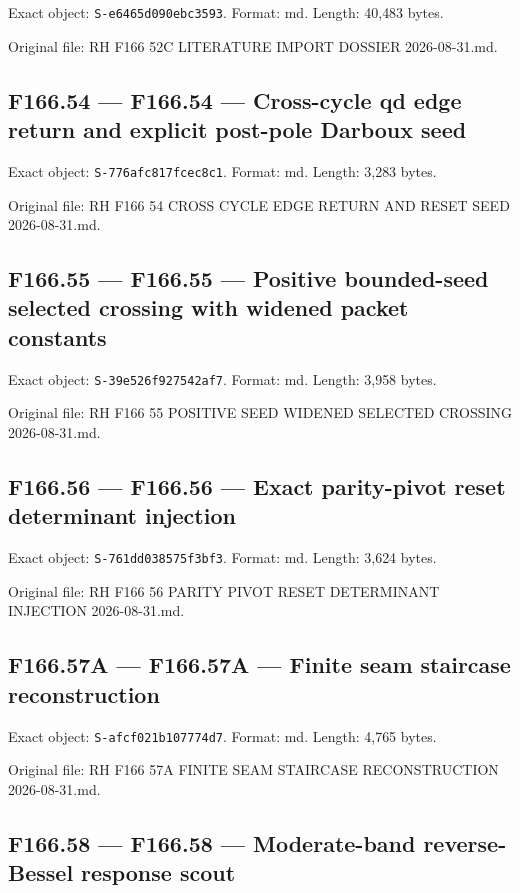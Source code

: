 \documentclass[
  10pt,
  a4paper,
  10pt,
  oneside,
  openany]{book}
\begin{document}
Exact object: \texttt{S-e6465d090ebc3593}. Format: md. Length: 40,483
bytes.

Original file: RH F166 52C LITERATURE IMPORT DOSSIER 2026-08-31.md.

\subsection{F166.54 --- F166.54 --- Cross-cycle qd edge return and
explicit post-pole Darboux seed}\label{source-f166-54}

Exact object: \texttt{S-776afc817fcec8c1}. Format: md. Length: 3,283
bytes.

Original file: RH F166 54 CROSS CYCLE EDGE RETURN AND RESET SEED
2026-08-31.md.

\subsection{F166.55 --- F166.55 --- Positive bounded-seed selected
crossing with widened packet constants}\label{source-f166-55}

Exact object: \texttt{S-39e526f927542af7}. Format: md. Length: 3,958
bytes.

Original file: RH F166 55 POSITIVE SEED WIDENED SELECTED CROSSING
2026-08-31.md.

\subsection{F166.56 --- F166.56 --- Exact parity-pivot reset determinant
injection}\label{source-f166-56}

Exact object: \texttt{S-761dd038575f3bf3}. Format: md. Length: 3,624
bytes.

Original file: RH F166 56 PARITY PIVOT RESET DETERMINANT INJECTION
2026-08-31.md.

\subsection{F166.57A --- F166.57A --- Finite seam staircase
reconstruction}\label{source-f166-57a}

Exact object: \texttt{S-afcf021b107774d7}. Format: md. Length: 4,765
bytes.

Original file: RH F166 57A FINITE SEAM STAIRCASE RECONSTRUCTION
2026-08-31.md.

\subsection{F166.58 --- F166.58 --- Moderate-band reverse-Bessel
response scout}\label{source-f166-58}
\end{document}
